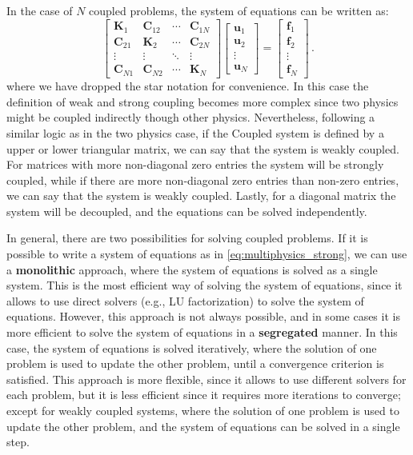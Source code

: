  In the case of $N$ coupled problems, the system of equations can be written as:
\begin{equation} \label{eq:multiphysics_strong}
    \begin{bmatrix}
        \mathbf{K}_1 & \mathbf{C}_{12} & \cdots & \mathbf{C}_{1N} \\
        \mathbf{C}_{21} & \mathbf{K}_2 & \cdots & \mathbf{C}_{2N} \\
        \vdots & \vdots & \ddots & \vdots\\
        \mathbf{C}_{N1} & \mathbf{C}_{N2} & \cdots & \mathbf{K}_N
    \end{bmatrix}
    \begin{bmatrix}
        \mathbf{u}_1\\
        \mathbf{u}_2\\
        \vdots\\
        \mathbf{u}_N
    \end{bmatrix}
    =
    \begin{bmatrix}
        \mathbf{f}_1\\
        \mathbf{f}_2\\
        \vdots\\
        \mathbf{f}_N
    \end{bmatrix}\,.
\end{equation}
where we have dropped the star notation for convenience. In this case the definition of weak and strong coupling
becomes more complex since two physics might be coupled indirectly though other physics. Nevertheless, following a similar logic as in the two physics case, if the Coupled
system is defined by a upper or lower triangular matrix, we can say that the system is weakly coupled. For matrices with more non-diagonal
zero entries the system will be strongly coupled, while if there are more non-diagonal zero entries than non-zero entries, we can say that the system is weakly coupled. Lastly,
for a diagonal matrix the system will be decoupled, and the equations can be solved independently.

In general, there are two possibilities for solving coupled problems. If it is possible to write a system of equations
as in \eqref{eq:multiphysics_strong}, we can use a \textbf{monolithic} approach, where the system of equations is solved as a single system.
This is the most efficient way of solving the system of equations, since it allows to use direct solvers (e.g., LU factorization) to solve the system of equations.
However, this approach is not always possible, and in some cases it is more efficient to solve the system of equations in a \textbf{segregated} manner.
In this case, the system of equations is solved iteratively, where the solution of one problem is used to update the other problem, until a convergence criterion is satisfied.
This approach is more flexible, since it allows to use different solvers for each problem, but it is less efficient since it requires more iterations to converge; 
except for weakly coupled systems, where the solution of one problem is used to update the other problem, and the system of equations can be solved in a single step.


